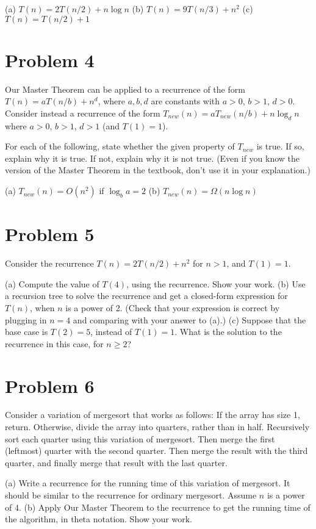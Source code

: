 \documentclass{article}
\begin{document}
(a) $T(n) = 2T(n/2) + n \log n$
(b) $T(n) = 9T(n/3) + n^2$
(c) $T(n) = T(n/2) + 1$

\section*{Problem 4}
Our Master Theorem can be applied to a recurrence of the form $T(n) = aT(n/b) + n^d$, where $a, b, d$ are constants with $a > 0$, $b > 1$, $d > 0$. Consider instead a recurrence of the form $T_{new}(n) = aT_{new}(n/b) + n \log_d n$ where $a > 0$, $b > 1$, $d > 1$ (and $T(1) = 1$).

For each of the following, state whether the given property of $T_{new}$ is true. If so, explain why it is true. If not, explain why it is not true. (Even if you know the version of the Master Theorem in the textbook, don’t use it in your explanation.)

(a) $T_{new}(n) = O(n^2)$ if $\log_b a = 2$
(b) $T_{new}(n) = \Omega(n \log n)$

\section*{Problem 5}
Consider the recurrence $T(n) = 2T(n/2) + n^2$ for $n > 1$, and $T(1) = 1$.

(a) Compute the value of $T(4)$, using the recurrence. Show your work.
(b) Use a recursion tree to solve the recurrence and get a closed-form expression for $T(n)$, when $n$ is a power of 2. (Check that your expression is correct by plugging in $n = 4$ and comparing with your answer to (a).)
(c) Suppose that the base case is $T(2) = 5$, instead of $T(1) = 1$. What is the solution to the recurrence in this case, for $n \ge 2$?

\section*{Problem 6}
Consider a variation of mergesort that works as follows: If the array has size 1, return. Otherwise, divide the array into quarters, rather than in half. Recursively sort each quarter using this variation of mergesort. Then merge the first (leftmost) quarter with the second quarter. Then merge the result with the third quarter, and finally merge that result with the last quarter.

(a) Write a recurrence for the running time of this variation of mergesort. It should be similar to the recurrence for ordinary mergesort. Assume $n$ is a power of 4.
(b) Apply Our Master Theorem to the recurrence to get the running time of the algorithm, in theta notation. Show your work.
\end{document}
